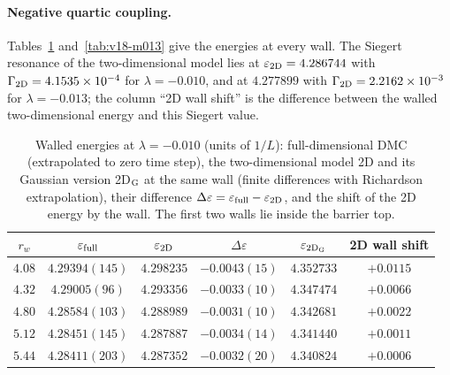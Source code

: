 \paragraph{Negative quartic coupling.}
Tables~\ref{tab:v18-m010} and~\ref{tab:v18-m013} give the energies at every wall.
The Siegert resonance of the two-dimensional model lies at $\varepsilon_{\rm 2D}=4.286744$ with $\Gamma_{\rm 2D}=4.1535\times10^{-4}$ for $\lambda=-0.010$, and at $4.277899$ with $\Gamma_{\rm 2D}=2.2162\times10^{-3}$ for $\lambda=-0.013$; the column ``2D wall shift'' is the difference between the walled two-dimensional energy and this Siegert value. %

\begin{table}[t]
\centering
\caption{Walled energies at $\lambda=-0.010$ (units of $1/L$): full-dimensional DMC (extrapolated to zero time step), the two-dimensional model 2D and its Gaussian version 2D$_{\rm G}$ at the same wall (finite differences with Richardson extrapolation), their difference $\Delta\varepsilon=\varepsilon_{\rm full}-\varepsilon_{\rm 2D}$, and the shift of the 2D energy by the wall. The first two walls lie inside the barrier top.}
\label{tab:v18-m010}
\begin{tabular}{cccccc}
\toprule
$r_w$ & $\varepsilon_{\rm full}$ & $\varepsilon_{\rm 2D}$ & $\Delta\varepsilon$ & $\varepsilon_{\rm 2D_G}$ & 2D wall shift \\
\midrule
$4.08$ & $4.29394(145)$ & $4.298235$ & $-0.0043(15)$ & $4.352733$ & $+0.0115$ \\ %
$4.32$ & $4.29005(96)$ & $4.293356$ & $-0.0033(10)$ & $4.347474$ & $+0.0066$ \\ %
$4.80$ & $4.28584(103)$ & $4.288989$ & $-0.0031(10)$ & $4.342681$ & $+0.0022$ \\ %
$5.12$ & $4.28451(145)$ & $4.287887$ & $-0.0034(14)$ & $4.341440$ & $+0.0011$ \\ %
$5.44$ & $4.28411(203)$ & $4.287352$ & $-0.0032(20)$ & $4.340824$ & $+0.0006$ \\ %
\bottomrule
\end{tabular}
\end{table}

